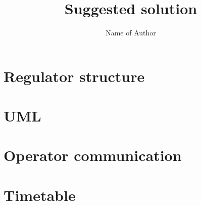 \documentclass{article}
\title{Suggested solution}
\author{Name of Author}
\begin{document}
\maketitle

\section{Regulator structure}


\section{UML}


\section{Operator communication
}

\section{Timetable}
\end{document}
